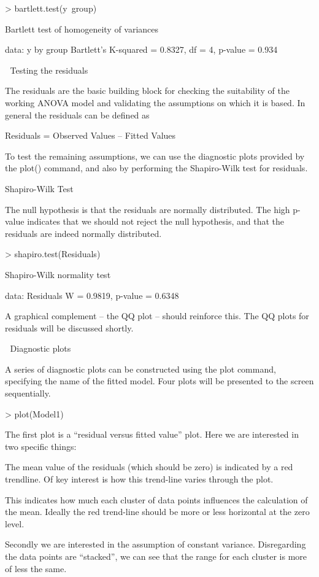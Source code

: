 > bartlett.test(y~group)

        Bartlett test of homogeneity of variances

data:  y by group 
Bartlett's K-squared = 0.8327, df = 4, p-value = 0.934



Testing the residuals

The residuals are the basic building block for checking the suitability of the working ANOVA model and validating the assumptions on which it is based. In general the residuals can be defined as

Residuals = Observed Values – Fitted Values

To test the remaining assumptions, we can use the diagnostic plots provided by the plot() command, and also by performing the Shapiro-Wilk test for residuals.

Shapiro-Wilk Test

The null hypothesis is that the residuals are normally distributed. The high p-value indicates that we should not reject the null hypothesis, and that the residuals are indeed normally distributed. 


> shapiro.test(Residuals)

        Shapiro-Wilk normality test

data:  Residuals 
W = 0.9819, p-value = 0.6348

A graphical complement – the QQ plot – should reinforce this. The QQ plots for residuals will be discussed shortly.



Diagnostic plots

A series of diagnostic plots can be constructed using the plot command, specifying the name of the fitted model. Four plots will be presented to the screen sequentially.


> plot(Model1)

The first plot is a “residual versus fitted value” plot. Here we are interested in two specific things: 

The mean value of the residuals (which should be zero) is indicated by a red trendline. Of key interest is how this trend-line varies through the plot. 

This indicates how much each cluster of data points influences the calculation of the mean. Ideally the red trend-line should be more or less horizontal at the zero level.


Secondly we are interested in the assumption of constant variance. Disregarding the data points are “stacked”, we can see that the range for each cluster is more of less the same.


